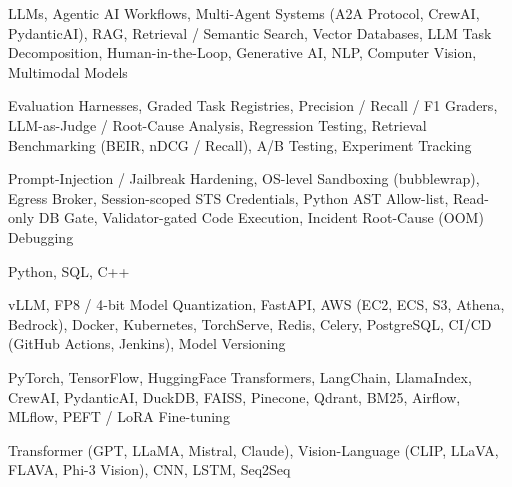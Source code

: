 \documentclass[letter,10pt]{article}
\begin{document}
 LLMs, Agentic AI Workflows, Multi-Agent Systems (A2A Protocol, CrewAI, PydanticAI), RAG, Retrieval / Semantic Search, Vector Databases, LLM Task Decomposition, Human-in-the-Loop, Generative AI, NLP, Computer Vision, Multimodal Models\par\vspace{2pt}

 Evaluation Harnesses, Graded Task Registries, Precision / Recall / F1 Graders, LLM-as-Judge / Root-Cause Analysis, Regression Testing, Retrieval Benchmarking (BEIR, nDCG / Recall), A/B Testing, Experiment Tracking\par\vspace{2pt}

 Prompt-Injection / Jailbreak Hardening, OS-level Sandboxing (bubblewrap), Egress Broker, Session-scoped STS Credentials, Python AST Allow-list, Read-only DB Gate, Validator-gated Code Execution, Incident Root-Cause (OOM) Debugging\par\vspace{2pt}

 Python, SQL, C++\par\vspace{2pt}

 vLLM, FP8 / 4-bit Model Quantization, FastAPI, AWS (EC2, ECS, S3, Athena, Bedrock), Docker, Kubernetes, TorchServe, Redis, Celery, PostgreSQL, CI/CD (GitHub Actions, Jenkins), Model Versioning\par\vspace{2pt}

 PyTorch, TensorFlow, HuggingFace Transformers, LangChain, LlamaIndex, CrewAI, PydanticAI, DuckDB, FAISS, Pinecone, Qdrant, BM25, Airflow, MLflow, PEFT / LoRA Fine-tuning\par\vspace{2pt}

 Transformer (GPT, LLaMA, Mistral, Claude), Vision-Language (CLIP, LLaVA, FLAVA, Phi-3 Vision), CNN, LSTM, Seq2Seq
\end{document}
